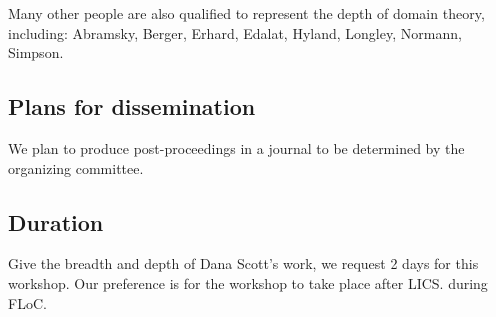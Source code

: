 \documentclass{article}
\begin{document}
Many other people are also qualified to represent the depth of domain theory, including: Abramsky, Berger, Erhard, Edalat, Hyland, Longley, Normann, Simpson. 

\subsection{Plans for dissemination}

We plan to produce post-proceedings in a journal to be determined by the organizing committee.

\subsection{Duration}

Give the breadth and depth of Dana Scott's work, we request 2 days for
this workshop.  Our preference is for the workshop to take place after
LICS.  during FLoC.
\end{document}
